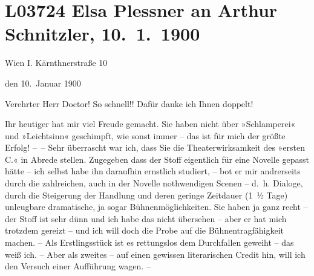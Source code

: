 

\section[Elsa Plessner an Arthur Schnitzler, 10. 1. 1900]{L03724 Elsa Plessner an Arthur Schnitzler, 10. 1. 1900}
\nopagebreak{}
\rehead{ }\normalsize\beginnumbering{}
\toendnotes[C]{\smallbreak\pagebreak[2]}
\toendnotes[C]{\smallbreak}
\pstart
           {\pb}Wien I. Kärnthnerstraße 10\pend
           
\pstart
           \raggedleft{}den 10. Januar 1900\pend
           
\pstart{}Verehrter Herr Doctor!\pend\vspace{0.5em}
\pstart
           So schnell!! Dafür danke ich
      Ihnen doppelt!
      \pend
           
\pstart
           Ihr heutiger{ }\label{K_L03724-1v}\label{K_L03724-1} hat mir
      viel Freude gemacht. Sie haben
      nicht über »Schlamperei« und
      »Leichtsinn« geschimpft, wie sonst
      immer – das ist für mich der
      größte Erfolg! – – Sehr überrascht war ich, dass Sie die
      Theaterwirksamkeit des »ersten C.« in Abrede stellen. Zugegeben
      dass der Stoff eigentlich für
      eine Novelle gepasst hätte –
      ich selbst habe ihn darauf{\pb}hin ernstlich studiert, – bot er
      mir andrerseits durch die zahlreichen, auch in der Novelle nothwendigen Scenen – d. h. Dialoge, durch
      die Steigerung der Handlung und
      deren geringe Zeitdauer (1 ½ Tage)
      unleugbare dramatische, ja
      sogar Bühnenmöglichkeiten.
      Sie haben ja ganz recht – der
      Stoff ist sehr dünn und ich
      habe das nicht übersehen – aber
      er hat mich trotzdem gereizt –
      und ich will doch die Probe auf
      die Bühnentragfähigkeit machen. – Als Erstlingsstück
      ist es rettungslos dem Durchfallen geweiht – das weiß ich. –
      Aber als zweites – auf einen {\pb}
      gewissen literarischen Credit
      hin, will ich den Versuch
      einer Aufführung wagen. –\pend
           
